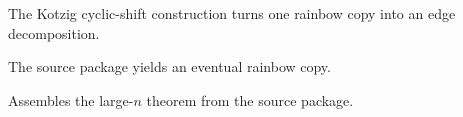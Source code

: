 \begin{theorem}\label{thm:decomp_of_rainbow_copy}
\leanok
The Kotzig cyclic-shift construction turns one rainbow copy into an edge decomposition.
\end{theorem}

\begin{theorem}\label{thm:rainbow_copy_exists}
The source package yields an eventual rainbow copy.
\end{theorem}

\begin{theorem}\label{thm:ringel_conjecture_large_via_spine}
Assembles the large-$n$ theorem from the source package.
\end{theorem}
